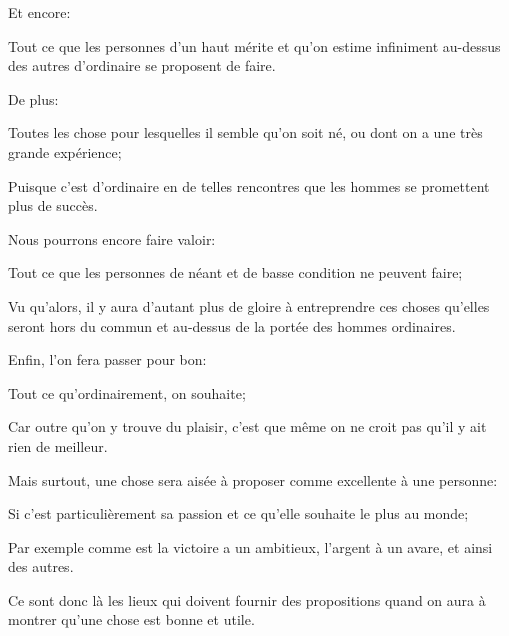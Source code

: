\bigbreak

Et encore: 

\begin{lieu}
	Tout ce que les personnes d'un haut mérite et qu'on estime infiniment au-dessus des autres d’ordinaire se
	proposent de faire.
\end{lieu}

\bigbreak

De plus:

\begin{lieu}
	Toutes les chose pour lesquelles il semble qu'on soit né, ou dont on a une très grande expérience;
\end{lieu}

Puisque c'est d'ordinaire en de telles rencontres que les hommes se promettent plus de succès. 

\bigbreak

Nous pourrons encore faire valoir:

\begin{lieu}
	Tout ce que les personnes de néant et de basse condition ne peuvent faire;
\end{lieu}

Vu qu'alors, il y aura d'autant plus de gloire à entreprendre ces choses qu'elles seront hors du commun et au-dessus
de la portée des hommes ordinaires. 

\bigbreak

Enfin, l'on fera passer pour bon:

\begin{lieu}
	Tout ce qu'ordinairement, on souhaite;
\end{lieu}

Car outre qu'on y trouve du plaisir, c'est que même on ne croit pas qu'il y ait rien de meilleur.

\bigbreak

Mais surtout, une chose sera aisée à proposer comme excellente à une personne:

\begin{lieu}
	Si c'est particulièrement sa passion et ce qu'elle souhaite le plus au monde;
\end{lieu}

Par exemple comme est la victoire a un ambitieux, l'argent à un avare, et ainsi des autres.

\bigbreak

Ce sont donc là les lieux qui doivent fournir des propositions quand on aura à montrer qu'une chose est bonne et utile.
